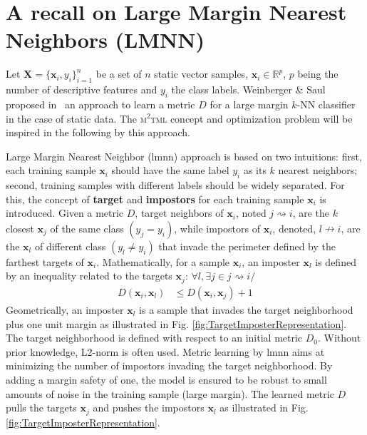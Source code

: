 \section{A recall on Large Margin Nearest Neighbors (LMNN)}
\label{LMNN}
Let $\textbf{X}=\{\textbf{x}_i,y_i\}_{i=1}^n$ be a set of $n$ static vector samples, ${\textbf{x}_i \in \mathbb{R}^{p}}$, $p$ being the number of descriptive features and $y_i$ the class labels. Weinberger \& Saul proposed in~\cite{Weinberger2009} an approach to learn a metric $D$ for a large margin $k$-NN classifier in the case of static data. The \textsc{m$^2$tml} concept and optimization problem will be inspired in the following by this approach.

Large Margin Nearest Neighbor ({\sc lmnn}) approach is based on two intuitions: first, each training sample $\textbf{x}_i$ should have the same label $y_i$ as its $k$ nearest neighbors; second, training samples with different labels should be widely separated. For this, the concept of \textbf{target} and \textbf{impostors} for each training sample $\textbf{x}_i$ is introduced. Given a metric $D$, target neighbors of $\textbf{x}_i$, noted $j \rightsquigarrow i$, are the $k$ closest $\textbf{x}_j$ of the same class $(y_j=y_i)$, while impostors of $\textbf{x}_i$, denoted, $l \nrightarrow i$, are the $\textbf{x}_l$ of different class $(y_l \neq y_i)$ that invade the perimeter defined by the farthest targets of $\textbf{x}_i$. 
Mathematically, for a sample $\textbf{x}_i$, an imposter $\textbf{x}_l$ is defined by an inequality related to the targets $\textbf{x}_j$: $\forall l, \exists j \in j \rightsquigarrow i /$
\begin{align}
	D(\textbf{x}_i,\textbf{x}_l) &\leq D(\textbf{x}_i,\textbf{x}_j) + 1
\end{align}
Geometrically, an imposter $\textbf{x}_{l}$ is a sample that invades the target neighborhood plus one unit margin as illustrated in Fig. \ref{fig:TargetImposterRepresentation}. 
The target neighborhood is defined with respect to an initial metric $D_0$. Without prior knowledge, L2-norm is often used. Metric learning by {\sc lmnn} aims at minimizing the number of impostors invading the target neighborhood. By adding a margin safety of one, the model is ensured to be robust to small amounts of noise in the training sample (large margin). The learned metric $D$ pulls the targets $\textbf{x}_j$ and pushes the impostors $\textbf{x}_{l}$ as illustrated in Fig. \ref{fig:TargetImposterRepresentation}.

